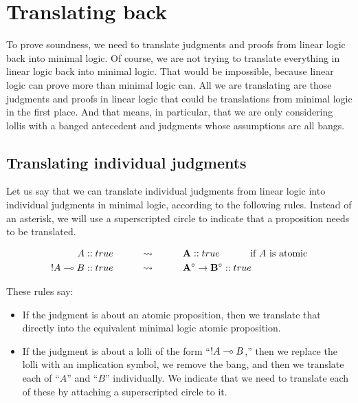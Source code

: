 \documentclass[../../../main.tex]{subfiles}
\begin{document}
\section{Translating back}

To prove soundness, we need to translate judgments and proofs from linear logic back into minimal logic. Of course, we are not trying to translate everything in linear logic back into minimal logic. That would be impossible, because linear logic can prove more than minimal logic can. All we are translating are those judgments and proofs in linear logic that could be translations from minimal logic in the first place. And that means, in particular, that we are only considering lollis with a banged antecedent and judgments whose assumptions are all bangs.


\subsection{Translating individual judgments}

Let us say that we can translate individual judgments from linear logic into individual judgments in minimal logic, according to the following rules. Instead of an asterisk, we will use a superscripted circle to indicate that a proposition needs to be translated.

\begin{align*}
  A :: true \hskip 1cm &\rightsquigarrow \hskip 1cm \nd{A} :: true \hskip 1cm \text{ if $A$ is atomic} \\
  \bang/A \lolli/ B :: true \hskip 1cm &\rightsquigarrow \hskip 1cm \nd{A}^{\circ} \impl/ \nd{B}^{\circ} :: true
\end{align*}

\noindent
These rules say: 

\begin{itemize}
  \item{If the judgment is about an atomic proposition, then we translate that directly into the equivalent minimal logic atomic proposition.}
  \item{If the judgment is about a lolli of the form ``$\bang/A \lolli/ B$,'' then we replace the lolli with an implication symbol, we remove the bang, and then we translate each of ``$A$'' and ``$B$'' individually. We indicate that we need to translate each of these by attaching a superscripted circle to it.}
\end{itemize}


\end{document}
